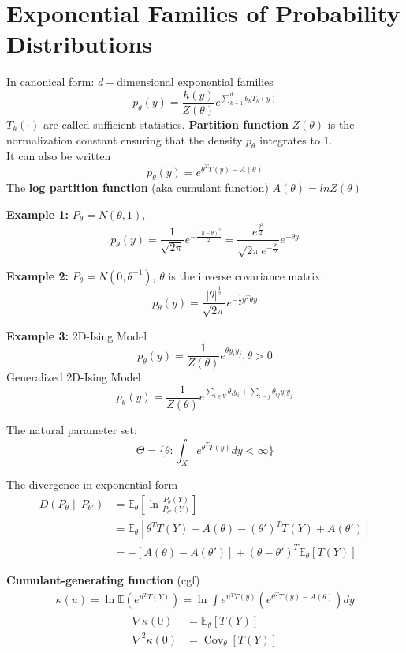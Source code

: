 \documentclass[11pt]{elegantbook}
\begin{document}
\section{Exponential Families of Probability Distributions}
\begin{definition}
    In canonical form: $d-$dimensional exponential families
    $$p_\theta(y)=\frac{h(y)}{Z(\theta)} e^{\sum_{k=1}^d\theta_k T_k(y)}$$
    $T_k (\cdot)$ are called sufficient statistics. \textbf{Partition function} $Z(\theta)$ is the normalization constant ensuring that the density $p_\theta$ integrates to $1$.\\
    It can also be written
    $$p_\theta(y)=e^{\theta^T T(y)-A(\theta)}$$
    The \textbf{log partition function} (aka cumulant function) $A(\theta) = ln Z(\theta)$
\end{definition}

\textbf{Example 1:} $P_\theta=N(\theta,1)$, $$p_\theta(y)=\frac{1}{\sqrt{2\pi}}e^{-\frac{(y-\theta)^2}{2}}=\frac{e^{\frac{y^2}{2}}}{\sqrt{2\pi}e^{-\frac{\theta^2}{2}}}e^{-\theta y}$$

\textbf{Example 2:} $P_\theta=N(0,\theta^{-1})$, $\theta$ is the inverse covariance matrix. $$p_\theta(y)=\frac{|\theta|^{\frac{1}{2}}}{\sqrt{2\pi}}e^{-\frac{1}{2}y^T\theta y}$$

\textbf{Example 3:} 2D-Ising Model $$p_\theta(y)=\frac{1}{Z(\theta)}e^{\theta y_iy_j},\theta>0$$
Generalized 2D-Ising Model $$p_\theta(y)=\frac{1}{Z(\theta)}e^{\sum_{i\in V}\theta_i y_i +\sum _{i\sim j}\theta_{ij} y_iy_j}$$

The natural parameter set:
$$\Theta=\{\theta:\int_X e^{\theta^T T(y)}dy<\infty\}$$

The divergence in exponential form
\begin{equation}
    \begin{aligned}
        D(P_\theta\| P_{\theta'})&=\mathbb{E}_\theta \left[\ln \frac{P_\theta (Y)}{P_{\theta'} (Y)}\right]\\
        &=\mathbb{E}_\theta[\theta^T T(Y)-A(\theta)-(\theta')^T T(Y)+A(\theta')]\\
        &=-[A(\theta)-A(\theta')]+(\theta-\theta')^T \mathbb{E}_\theta [T(Y)]
    \end{aligned}
    \nonumber
\end{equation}

\textbf{Cumulant-generating function} (cgf)
\begin{equation}
    \begin{aligned}
        \kappa(u)=\ln \mathbb{E}(e^{u^TT(Y)})=\ln \int e^{u^TT(y)}(e^{\theta^T T(y)-A(\theta)}) dy
    \end{aligned}
    \nonumber
\end{equation}
\begin{equation}
    \begin{aligned}
    \nabla \kappa(0)&=\mathbb{E}_\theta[T(Y)] \\
    \nabla^2 \kappa(0)&=\operatorname{Cov}_\theta[T(Y)]
    \end{aligned}
    \nonumber
\end{equation}
\end{document}
